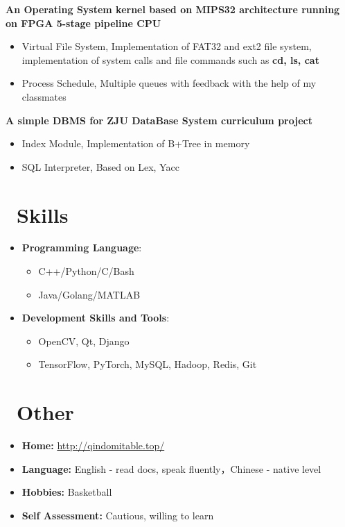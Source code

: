 \documentclass{resume}
\begin{document}
\textbf{An Operating System kernel based on MIPS32 architecture running on FPGA 5-stage pipeline CPU}
\begin{itemize}
  \item Virtual File System, Implementation of FAT32 and ext2 file system, implementation of system calls and file commands such as \textbf{cd, ls, cat}
  \item Process Schedule, Multiple queues with feedback with the help of my classmates
\end{itemize}

\textbf{A simple DBMS for ZJU DataBase System curriculum project}
\begin{itemize}
  \item Index Module, Implementation of B+Tree in memory
  \item SQL Interpreter, Based on Lex, Yacc
\end{itemize}

\section{\faCogs\ Skills}
\begin{itemize}[parsep=0.5ex]
  \item \textbf{Programming Language}:
  \begin{itemize}
        \item C++/Python/C/Bash
        \item Java/Golang/MATLAB
  \end{itemize}
  \item \textbf{Development Skills and Tools}:
   \begin{itemize}
         \item OpenCV, Qt, Django
         \item TensorFlow, PyTorch, MySQL, Hadoop, Redis, Git
   \end{itemize}
\end{itemize}

\section{\faInfo\ Other}
\begin{itemize}[parsep=0.5ex]
  \item \textbf{Home:} \url{http://qindomitable.top/}
  \item \textbf{Language:} English - read docs, speak fluently，Chinese - native level
  \item \textbf{Hobbies:} Basketball
  \item \textbf{Self Assessment:} Cautious, willing to learn
\end{itemize}
\end{document}
